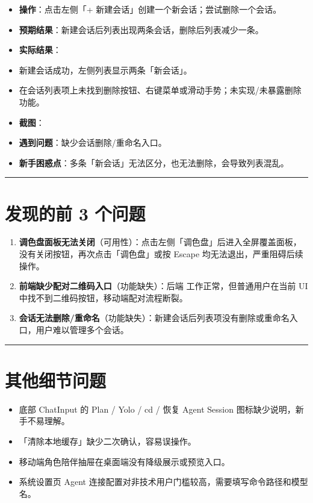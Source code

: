 \documentclass[12pt,a4paper]{ctexart}
\begin{document}
\begin{itemize}[leftmargin=2em]
\item \textbf{操作}：点击左侧「+ 新建会话」创建一个新会话；尝试删除一个会话。
\item \textbf{预期结果}：新建会话后列表出现两条会话，删除后列表减少一条。
\item \textbf{实际结果}：
\item 新建会话成功，左侧列表显示两条「新会话」。
\item 在会话列表项上未找到删除按钮、右键菜单或滑动手势；未实现/未暴露删除功能。
\item \textbf{截图}：
\item \textbf{遇到问题}：缺少会话删除/重命名入口。
\item \textbf{新手困惑点}：多条「新会话」无法区分，也无法删除，会导致列表混乱。
\end{itemize}

\hrule


\section{发现的前 3 个问题}

\begin{enumerate}[leftmargin=2em]
\item \textbf{调色盘面板无法关闭}（可用性）：点击左侧「调色盘」后进入全屏覆盖面板，没有关闭按钮，再次点击「调色盘」或按 Escape 均无法退出，严重阻碍后续操作。
\item \textbf{前端缺少配对二维码入口}（功能缺失）：后端  工作正常，但普通用户在当前 UI 中找不到二维码按钮，移动端配对流程断裂。
\item \textbf{会话无法删除/重命名}（功能缺失）：新建会话后列表项没有删除或重命名入口，用户难以管理多个会话。
\end{enumerate}

\hrule


\section{其他细节问题}

\begin{itemize}[leftmargin=2em]
\item 底部 ChatInput 的 Plan / Yolo / cd / 恢复 Agent Session 图标缺少说明，新手不易理解。
\item 「清除本地缓存」缺少二次确认，容易误操作。
\item 移动端角色陪伴抽屉在桌面端没有降级展示或预览入口。
\item 系统设置页 Agent 连接配置对非技术用户门槛较高，需要填写命令路径和模型名。
\end{itemize}
\end{document}
